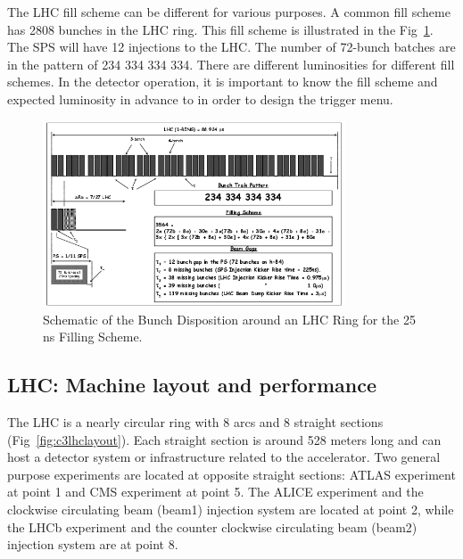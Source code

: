 The LHC fill scheme can be different for various purposes. A common fill scheme has 2808 bunches in the LHC ring. This fill scheme is illustrated in the Fig~\ref{fig:c3lhcfillscheme}. The SPS will have 12 injections to the LHC. The number of 72-bunch batches are in the pattern of 234 334 334 334. There are different luminosities for different fill schemes. In the detector operation, it is important to know the fill scheme and expected luminosity in advance to in order to design the trigger menu. 

\begin{figure}[htbp]
 \begin{center}
  \includegraphics[width=0.8\textwidth]{figures/c3/c3_lhc_fillscheme.png}
 \end{center}
 \caption{Schematic of the Bunch Disposition around an LHC Ring for the 25 ns Filling Scheme.}
 \label{fig:c3lhcfillscheme}
\end{figure}

\subsection{LHC: Machine layout and performance}

The LHC is a nearly circular ring with 8 arcs and 8 straight sections (Fig~\ref{fig:c3lhclayout}). Each straight section is around 528 meters long and can host a detector system or infrastructure related to the accelerator. Two general purpose experiments are located at opposite straight sections: ATLAS experiment at point 1 and CMS experiment at point 5. The ALICE experiment and the clockwise circulating beam (beam1) injection system are located at point 2, while the LHCb experiment and the counter clockwise circulating beam (beam2) injection system are at point 8. 

